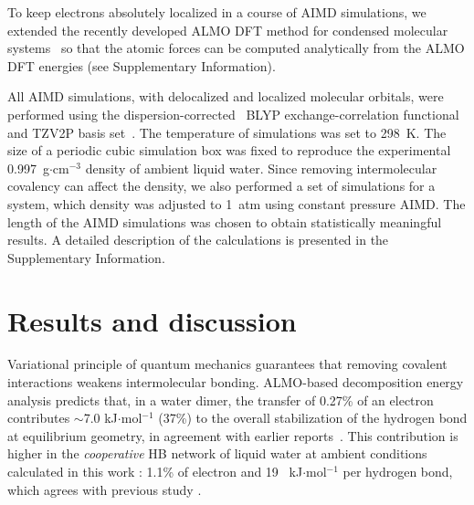 \documentclass[aps,prl,reprint,amsmath,amssymb]{revtex4-1}
\begin{document}
To keep electrons absolutely localized in a course of AIMD simulations, we extended the recently developed ALMO DFT method for  condensed molecular systems~\cite{Khaliullin2013JCTC} so that the atomic forces can be computed analytically from the ALMO DFT energies (see Supplementary Information). 

All AIMD simulations, with delocalized and localized molecular orbitals, were performed using the dispersion-corrected~\cite{grimme2010consistent} BLYP exchange-correlation functional~\cite{becke1988density} and TZV2P basis set~\cite{vandevondele2007gaussian}. The temperature of simulations was set to 298~K. The size of a periodic cubic simulation box was fixed to reproduce the experimental 0.997~g$\cdot$cm$^{-3}$ density of ambient liquid water. Since removing intermolecular covalency can affect the density, we also performed a set of simulations for a system, which density was adjusted to 1~atm using constant pressure AIMD. The length of the AIMD simulations was chosen to obtain statistically meaningful results. A detailed description of the calculations is presented in the Supplementary Information.


\section{Results and discussion}

Variational principle of quantum mechanics guarantees that removing covalent interactions weakens intermolecular bonding. ALMO-based decomposition energy analysis predicts that, in a water dimer, the transfer of 0.27\% of an electron contributes  $\sim$7.0 kJ$\cdot$mol$^{-1}$ (37\%) to the overall stabilization of the hydrogen bond at equilibrium geometry, in agreement with earlier reports~\cite{stevens1987frozen,chen1996energy,piquemal2005csov}. This contribution is higher in the \emph{cooperative} HB network of liquid water at ambient conditions \new calculated in this work \old:  1.1\% of electron and 19 ~kJ$\cdot$mol$^{-1}$ per hydrogen bond, \new which agrees with previous study \old\cite{kuhne2014nature}.
\end{document}
